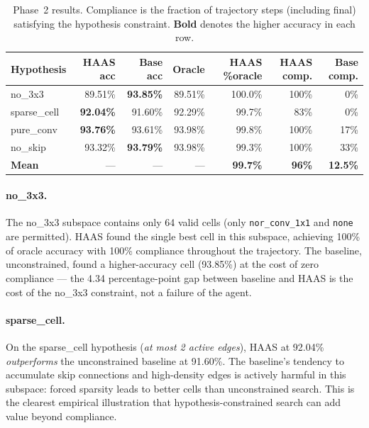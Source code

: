 \documentclass[10pt]{article}
\newcommand{\haas}{\textsc{HAAS}}
\begin{document}
\begin{table}[t]
\caption{Phase~2 results. Compliance is the fraction of trajectory steps
         (including final) satisfying the hypothesis constraint.
         \textbf{Bold} denotes the higher accuracy in each row.}
\label{tab:phase2-main}
\begin{center}
\small
\begin{tabular}{lrrrrrr}
\toprule
\textbf{Hypothesis} & \textbf{HAAS acc} & \textbf{Base acc} &
                      \textbf{Oracle} & \textbf{HAAS \%oracle} &
                      \textbf{HAAS comp.} & \textbf{Base comp.} \\
\midrule
no\_3x3      & 89.51\% & \textbf{93.85\%} & 89.51\% & 100.0\% & 100\% &  0\% \\
sparse\_cell & \textbf{92.04\%} & 91.60\% & 92.29\% & 99.7\% &  83\% &  0\% \\
pure\_conv   & \textbf{93.76\%} & 93.61\% & 93.98\% & 99.8\% & 100\% & 17\% \\
no\_skip     & 93.32\% & \textbf{93.79\%} & 93.98\% & 99.3\% & 100\% & 33\% \\
\midrule
\textbf{Mean} & --- & --- & --- & \textbf{99.7\%} & \textbf{96\%} & \textbf{12.5\%} \\
\bottomrule
\end{tabular}
\end{center}
\end{table}

\paragraph{no\_3x3.}
The no\_3x3 subspace contains only 64 valid cells (only \texttt{nor\_conv\_1x1}
and \texttt{none} are permitted). \haas{} found the single best cell in this
subspace, achieving 100\% of oracle accuracy with 100\% compliance throughout
the trajectory. The baseline, unconstrained, found a higher-accuracy cell
(93.85\%) at the cost of zero compliance --- the 4.34 percentage-point gap
between baseline and \haas{} is the cost of the no\_3x3 constraint, not
a failure of the agent.

\paragraph{sparse\_cell.}
On the sparse\_cell hypothesis (\textit{at most 2 active edges}), \haas{} at
92.04\% \emph{outperforms} the unconstrained baseline at 91.60\%. The baseline's
tendency to accumulate skip connections and high-density edges is actively harmful
in this subspace: forced sparsity leads to better cells than unconstrained search.
This is the clearest empirical illustration that hypothesis-constrained search can
add value beyond compliance.
\end{document}
